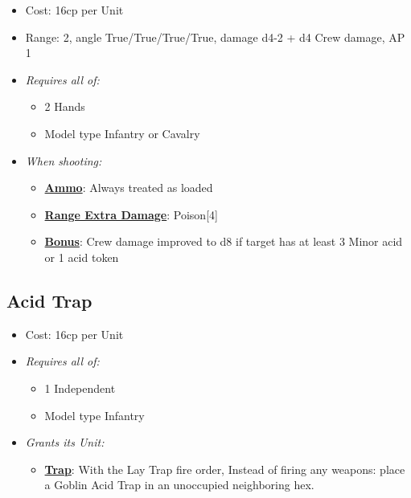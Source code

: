 \documentclass[a4paper,12pt]{article}
\begin{document}
\begin{itemize}
\item Cost: 16cp per Unit
\item Range: 2, angle True/True/True/True, damage d4-2 + d4 Crew damage, AP 1
\item \textit{Requires all of:}
\begin{itemize}
\item 2 Hands
\item Model type Infantry or Cavalry
\end{itemize}
\item \textit{When shooting:}
\begin{itemize}
\item \textbf{\hyperref[rule-special-ammo]{Ammo}}: Always treated as loaded
\item \textbf{\hyperref[rule-special-range-extra-damage]{Range Extra Damage}}: Poison[4]
\item \textbf{\hyperref[rule-special-bonus]{Bonus}}: Crew damage improved to d8 if target has at least 3 Minor acid or 1 acid token

\end{itemize}






\end{itemize}

\subsection{Acid Trap}
\label{equipment-acid-trap}

\begin{itemize}
\item Cost: 16cp per Unit
\item \textit{Requires all of:}
\begin{itemize}
\item 1 Independent
\item Model type Infantry
\end{itemize}




\item \textit{Grants its Unit:}
\begin{itemize}
\item \textbf{\hyperref[rule-special-trap]{Trap}}: With the Lay Trap fire order, Instead of firing any weapons: place a Goblin Acid Trap in an unoccupied neighboring hex.

\end{itemize}


\end{itemize}
\end{document}
